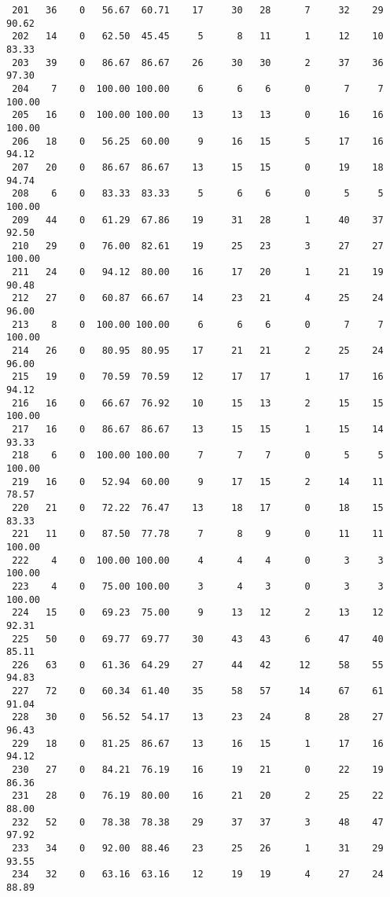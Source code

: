\begin{verbatim}
 201   36    0   56.67  60.71    17     30   28      7     32    29    90.62
 202   14    0   62.50  45.45     5      8   11      1     12    10    83.33
 203   39    0   86.67  86.67    26     30   30      2     37    36    97.30
 204    7    0  100.00 100.00     6      6    6      0      7     7   100.00
 205   16    0  100.00 100.00    13     13   13      0     16    16   100.00
 206   18    0   56.25  60.00     9     16   15      5     17    16    94.12
 207   20    0   86.67  86.67    13     15   15      0     19    18    94.74
 208    6    0   83.33  83.33     5      6    6      0      5     5   100.00
 209   44    0   61.29  67.86    19     31   28      1     40    37    92.50
 210   29    0   76.00  82.61    19     25   23      3     27    27   100.00
 211   24    0   94.12  80.00    16     17   20      1     21    19    90.48
 212   27    0   60.87  66.67    14     23   21      4     25    24    96.00
 213    8    0  100.00 100.00     6      6    6      0      7     7   100.00
 214   26    0   80.95  80.95    17     21   21      2     25    24    96.00
 215   19    0   70.59  70.59    12     17   17      1     17    16    94.12
 216   16    0   66.67  76.92    10     15   13      2     15    15   100.00
 217   16    0   86.67  86.67    13     15   15      1     15    14    93.33
 218    6    0  100.00 100.00     7      7    7      0      5     5   100.00
 219   16    0   52.94  60.00     9     17   15      2     14    11    78.57
 220   21    0   72.22  76.47    13     18   17      0     18    15    83.33
 221   11    0   87.50  77.78     7      8    9      0     11    11   100.00
 222    4    0  100.00 100.00     4      4    4      0      3     3   100.00
 223    4    0   75.00 100.00     3      4    3      0      3     3   100.00
 224   15    0   69.23  75.00     9     13   12      2     13    12    92.31
 225   50    0   69.77  69.77    30     43   43      6     47    40    85.11
 226   63    0   61.36  64.29    27     44   42     12     58    55    94.83
 227   72    0   60.34  61.40    35     58   57     14     67    61    91.04
 228   30    0   56.52  54.17    13     23   24      8     28    27    96.43
 229   18    0   81.25  86.67    13     16   15      1     17    16    94.12
 230   27    0   84.21  76.19    16     19   21      0     22    19    86.36
 231   28    0   76.19  80.00    16     21   20      2     25    22    88.00
 232   52    0   78.38  78.38    29     37   37      3     48    47    97.92
 233   34    0   92.00  88.46    23     25   26      1     31    29    93.55
 234   32    0   63.16  63.16    12     19   19      4     27    24    88.89

\end{verbatim}
